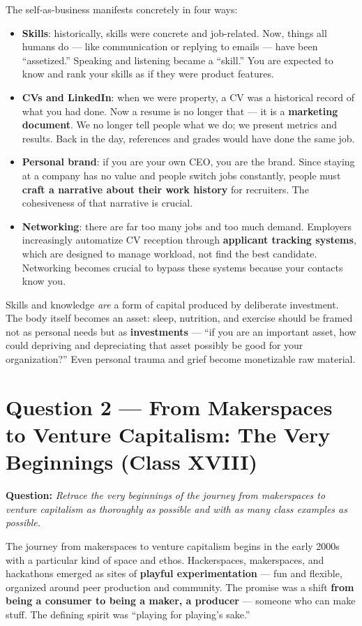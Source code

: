 \documentclass[11pt,a4paper]{article}
\begin{document}
The self-as-business manifests concretely in four ways:
\begin{itemize}
	\item \textbf{Skills}: historically, skills were concrete and job-related. Now, things all humans do --- like communication or replying to emails --- have been ``assetized.'' Speaking and listening became a ``skill.'' You are expected to know and rank your skills as if they were product features.
	\item \textbf{CVs and LinkedIn}: when we were property, a CV was a historical record of what you had done. Now a resume is no longer that --- it is a \textbf{marketing document}. We no longer tell people what we do; we present metrics and results. Back in the day, references and grades would have done the same job.
	\item \textbf{Personal brand}: if you are your own CEO, you are the brand. Since staying at a company has no value and people switch jobs constantly, people must \textbf{craft a narrative about their work history} for recruiters. The cohesiveness of that narrative is crucial.
	\item \textbf{Networking}: there are far too many jobs and too much demand. Employers increasingly automatize CV reception through \textbf{applicant tracking systems}, which are designed to manage workload, not find the best candidate. Networking becomes crucial to bypass these systems because your contacts know you.
\end{itemize}

Skills and knowledge \textit{are} a form of capital produced by deliberate investment. The body itself becomes an asset: sleep, nutrition, and exercise should be framed not as personal needs but as \textbf{investments} --- ``if you are an important asset, how could depriving and depreciating that asset possibly be good for your organization?'' Even personal trauma and grief become monetizable raw material.

\section*{Question 2 --- From Makerspaces to Venture Capitalism: The Very Beginnings (Class XVIII)}

\textbf{Question:} \textit{Retrace the very beginnings of the journey from makerspaces to venture capitalism as thoroughly as possible and with as many class examples as possible.}

The journey from makerspaces to venture capitalism begins in the early 2000s with a particular kind of space and ethos. Hackerspaces, makerspaces, and hackathons emerged as sites of \textbf{playful experimentation} --- fun and flexible, organized around peer production and community. The promise was a shift \textbf{from being a consumer to being a maker, a producer} --- someone who can make stuff. The defining spirit was ``playing for playing's sake.''
\end{document}
